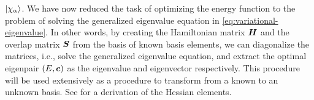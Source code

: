             $\ket{\chi_{\alpha}}$.
            We have now reduced the task of optimizing the energy function to
            the problem of solving the generalized eigenvalue equation in
            \autoref{eq:variational-eigenvalue}.
            In other words, by creating the Hamiltonian matrix $\boldsymbol{H}$ and
            the overlap matrix $\boldsymbol{S}$ from the basis of known basis
            elements, we can diagonalize the matrices, i.e., solve the
            generalized eigenvalue equation, and extract the optimal eigenpair
            $(E, \boldsymbol{c})$ as the eigenvalue and eigenvector respectively.
            This procedure will be used extensively as a procedure to transform
            from a known to an unknown basis.
            See  \cite{helgaker-molecular} for a
            derivation of the Hessian elements.

